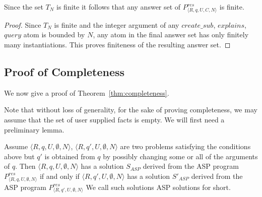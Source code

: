 \begin{lemma}
Since the set $T_{N}$ is finite it follows that any answer set of $P_{\langle
  R,q,U,C,N \rangle}^{res}$ is finite.
\end{lemma}

\begin{proof}
Since $T_{N}$ is finite and the integer argument of any $create\_sub$, $explains$, $query$ 
atom is bounded by $N$, any atom in the final answer set has only finitely
many instantiations. This proves finiteness of the resulting answer set.
\end{proof}

\subsection{Proof of Completeness}\label{sec:proof_completenes}

We now give a proof of Theorem~\ref{thm:completeness}.


Note that without loss of generality, for the sake of proving completeness, we may assume that the set of user supplied facts is empty. We will first need a preliminary lemma.

\begin{lemma}
Assume $\langle R,q,U,\emptyset,N\rangle$, $\langle R,q',U,\emptyset,N\rangle$ are two
problems satisfying the conditions above but $q'$ is obtained from $q$ by
possibly changing some or all of the arguments of $q$. Then $\langle
R,q,U,\emptyset,N\rangle$ has a solution $S_{ASP}$ derived from the ASP program $P_{\langle R,q,U,\emptyset,N\rangle}^{res}$ if and only if $\langle R,q',U,\emptyset,N\rangle$ has a solution $S'_{ASP}$ derived from the ASP program $P_{\langle R,q',U,\emptyset,N\rangle}^{res}$ We call such solutions ASP solutions for short.
\end{lemma}

